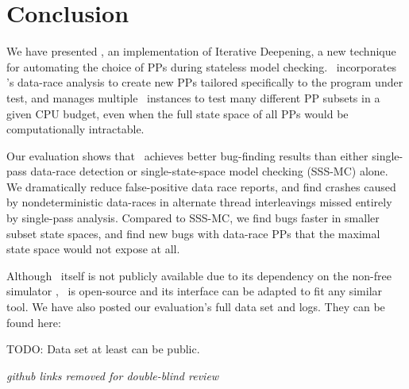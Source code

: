 \documentclass[pldi]{sigplanconf-pldi15}
\begin{document}







\section{Conclusion}


We have presented \quicksand, an implementation of Iterative Deepening, a new technique for automating the choice of PPs during stateless model checking.
\quicksand~incorporates \landslide's data-race analysis to create new PPs tailored specifically to the program under test,
and manages multiple \landslide~instances to test many different PP subsets in a given CPU budget, even when the full state space of all PPs would be computationally intractable.

Our evaluation shows that \quicksand~achieves better bug-finding results than either single-pass data-race detection or single-state-space model checking (SSS-MC) alone.
We dramatically reduce false-positive data race reports,
and find crashes caused by nondeterministic data-races in alternate thread interleavings missed entirely by single-pass analysis.
Compared to SSS-MC, we find bugs faster in smaller subset state spaces,
and find new bugs with data-race PPs that the maximal state space would not expose at all.

Although \landslide~itself is not publicly available due to its dependency on the non-free simulator \simics, \quicksand~is open-source and its interface can be adapted to fit any similar tool.
We have also posted our evaluation's full data set and logs.
They can be found here:

TODO: Data set at least can be public.

{\em github links removed for double-blind review}
%
\end{document}
